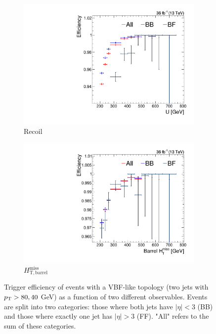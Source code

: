 \begin{figure}[]
    \begin{center}
        \begin{subfigure}[t]{0.49\textwidth}
            \includegraphics[width=\textwidth]{figures/vbf/triggers/trigeff_nmu1pfUWmag.pdf}
            \caption{Recoil}
            \label{fig:vbf:hlta}
        \end{subfigure}
        \begin{subfigure}[t]{0.49\textwidth}
            \includegraphics[width=\textwidth]{figures/vbf/triggers/trigeff_nmu1barrelHTMiss.pdf}
            \caption{$H_\mathrm{T,barrel}^\mathrm{miss}$}
            \label{fig:vbf:hltb}
        \end{subfigure}
        \caption{Trigger efficiency of events with a VBF-like topology (two jets with $p_\mathrm{T}>80,40$ GeV) as a function of two different observables.
                 Events are split into two categories: those where both jets have $|\eta|<3$ (BB) and those where exactly one jet has $|\eta|>3$ (FF).
                 "All" refers to the sum of these categories.}
        \label{fig:vbf:hlt}
    \end{center}
\end{figure}

